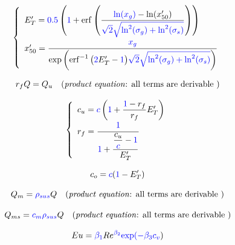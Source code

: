 \documentclass[12pt,reqno,intlimits,twoside]{amsart}
\DeclareMathOperator{\erf}{erf}%
\begin{document}
\begin{equation}\label{EqERedTred50} %
   \left\{
   \begin{array}{l}
      E'_T = \textcolor{blue}{0.5}
              \left(\textcolor{blue}{1} +
                   \erf\left(\dfrac{\textcolor{blue}{\ln(x_g)} - \ln(x'_{50})}
                             {\textcolor{blue}{\sqrt{2}\sqrt{\ln^2(\sigma_g) + \ln^2(\sigma_s)}}}
                       \right)
              \right)  \\
      x'_{50} = \dfrac{\textcolor{blue}{x_g}\strut}%
                      {\exp\left(\erf^{-1}\big(\textcolor{blue}{2}E'_T - \textcolor{blue}{1}\big)
                       \textcolor{blue}{\sqrt{2}\sqrt{\ln^2(\sigma_g) + \ln^2(\sigma_s)}}\right)
                      }
   \end{array}
   \right.
\end{equation}

\begin{equation}\label{EqRfQQu} %
   r_f Q = Q_u\quad\text{(\emph{product equation}: all terms are derivable )}
\end{equation}

\begin{equation}\label{EqCuRfERedT} %
   \left\{
   \begin{array}{l}
      c_u = \textcolor{blue}{c}\left(\textcolor{blue}{1} + \dfrac{\textcolor{blue}{1} - r_f}{r_f}E'_T\right)\\
      r_f = \dfrac{\textcolor{blue}{1}\strut}{\textcolor{blue}{1} + \dfrac{\dfrac{c_u}{\textcolor{blue}{c}} - \textcolor{blue}{1}}{E'_T}}
   \end{array}
   \right.
\end{equation}

\begin{equation}\label{EqCoERedT} %
   c_o = \textcolor{blue}{c}(\textcolor{blue}{1} - E'_T)
\end{equation}

\begin{equation}\label{EqQmQ} %
   Q_m = \textcolor{blue}{\rho_{sus}} Q\quad\text{(\emph{product equation}: all terms are derivable )}
\end{equation}

\begin{equation}\label{EqQmsQ} %
   Q_{ms} = \textcolor{blue}{c_m \rho_{sus}} Q\quad\text{(\emph{product equation}: all terms are derivable )}
\end{equation}

\begin{equation}\label{EqEuRe} %
   Eu = \textcolor{blue}{\beta_1} Re^{\textcolor{blue}{\beta_2}} \textcolor{blue}{\exp(-\beta_3 c_v})
\end{equation}
\end{document}
